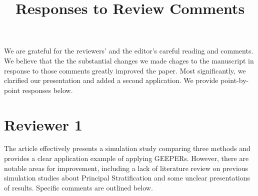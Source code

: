 \documentclass[]{article}
\title{Responses to Review Comments}
\date{}
\begin{document}
\maketitle
We are grateful for the reviewers' and the editor's careful reading
and comments. We believe that the the substantial changes we made
chages to the manuscript in response to those comments greatly
improved the paper. Most significantly, we clarified our presentation
and added a second application.
We provide point-by-point responses below.

\section*{Reviewer 1}

The article effectively presents a simulation study comparing three methods and provides a clear application example of applying GEEPERs. However, there are notable areas for improvement, including a lack of literature review on previous simulation studies about Principal Stratification and some unclear presentations of results. Specific comments are outlined below.
\end{document}

